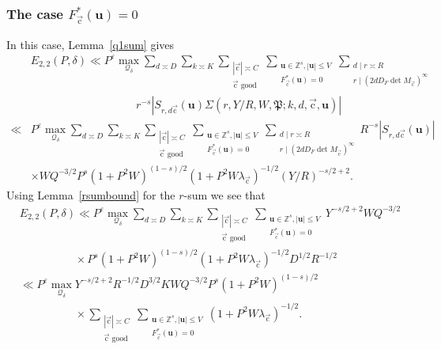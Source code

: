 \documentclass[letterpaper,11pt]{amsart}
\numberwithin{equation}{section}
\theoremstyle{definition}
\numberwithin{equation}{section}
\newcommand{\ZZ}{\mathbb{Z}}
\newcommand{\uu}{\mathbf{u}}
\newcommand{\uc}{{\vec{\mathrm{c}}}}
\newcommand{\ve}{\varepsilon}
\newcommand{\F}{{\underline{F}}}
\begin{document}
\subsubsection{The case $F_\uc^*(\uu)=0$}\label{sec:good-c-even-s-F-zero}
In this case, Lemma~\ref{q1sum} gives 
\begin{align*}
& E_{2,2}(P, \delta)\ll P^{\ve} \max_{ \mathcal Q_\delta}\sum_{d\asymp D}\sum_{k\asymp K}\sum_{\substack{|\uc|\asymp C\\ \uc \text{ good}}}\sum_{\substack{\uu\in\ZZ^s,  |\uu|\leq V\\F_{\uc}^*(\uu)=0 }}\sum_{\substack{d\mid r\asymp R\\ r\mid (2dD_F\det M_\uc)^\infty}}\\& \hspace{4cm} r^{-s}|S_{r, d\uc}(\uu) \Sigma(r, Y/R, W, \mathfrak P;k,d, \uc, \uu)|\\
\ll & P^{\ve} \max_{ \mathcal Q_\delta} \sum_{d\asymp D}\sum_{k\asymp K}\sum_{\substack{|\uc|\asymp C\\ \uc \text{ good}}}\sum_{\substack{\uu\in\ZZ^s,  |\uu|\leq V\\ F_{\uc}^*(\uu)=0 }}\sum_{\substack{d\mid r\asymp R\\ r\mid (2dD_F\det M_\uc)^\infty}}R^{-s}|S_{r, d\uc}(\uu)| \\&
\times W Q^{-3/2} P^{s} (1+P^2W)^{(1-s)/2}(1+P^2W\lambda_\uc)^{-1/2} (Y/R)^{-s/2+2}.
\end{align*}
Using Lemma~\ref{rsumbound} for the $r$-sum we see that 
\begin{align}\nonumber
& E_{2,2}(P, \delta)\ll P^{\ve}\max_{\mathcal Q_\delta} \sum_{d\asymp D}\sum_{k\asymp K}\sum_{\substack{|\uc|\asymp C\\ \uc \text{ good}}}\sum_{\substack{\uu\in\ZZ^s,  |\uu|\leq V\\ F_{\uc}^*(\uu)=0 }} Y^{-s/2+2} WQ^{-3/2} \\
\nonumber& \quad \quad \quad\quad \quad \times P^{s}(1+P^2W)^{(1-s)/2}(1+P^2W\lambda_\uc)^{-1/2} D^{1/2}R^{-1/2}\\
\nonumber
&\ll P^{\ve} \max_{\mathcal Q_\delta} Y^{-s/2+2} R^{-1/2}D^{3/2} K WQ^{-3/2} P^{s} (1+P^2W)^{(1-s)/2}\\& \quad \quad \quad\quad \quad \times \sum_{\substack{|\uc|\asymp C\\ \uc \text{ good}}}\sum_{\substack{\uu\in\ZZ^s,  |\uu|\leq V\\ F_{\uc}^*(\uu)=0 }} (1+P^2W\lambda_{\uc})^{-1/2}.\label{evenn22}
\end{align}
\end{document}
